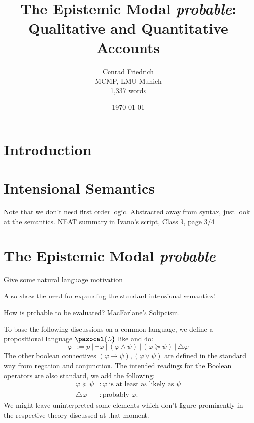 \documentclass{article}
\title{The Epistemic Modal \emph{probable}: Qualitative and Quantitative Accounts}
\author{Conrad Friedrich \\ MCMP, LMU Munich \\ 1,337 words}
\date{\today}
\theoremstyle{definition}
\renewcommand{\L}{\pazocal{L}}
\begin{document}
\onehalfspacing

\maketitle

\tableofcontents
\section{Introduction}



\section{Intensional Semantics}
Note that we don't need first order logic. 
Abstracted away from syntax, just look at the semantics.
NEAT summary in Ivano's script, Class 9, page 3/4
\section{The Epistemic Modal \emph{probable}}
Give some natural language motivation

Also show the need for expanding the standard intensional semantics!

How is probable to be evaluated? MacFarlane's Solipcism. 

To base the following discussions on a common language, we define a
propositional language $\L$ like \textcite{harrison-trainor17_prefer} and
\textcite{holliday13_measur} do:
\[
\varphi ::= p ~|~ \neg \varphi ~|~ (\varphi \land \psi) ~|~  (\varphi \succeq \psi) ~|~ \triangle\varphi 
\]
The other boolean connectives $(\varphi \rightarrow \psi), (\varphi \vee
\psi)$ are defined in the standard way from negation and conjunction. The
intended readings for the Boolean operators are also standard, we add the following:
\begin{align*}
  \varphi \succeq \psi &: \varphi \text{ is at least as likely as } \psi \\
  \triangle \varphi &:\text{probably } \varphi.
\end{align*}
We might leave uninterpreted some elements which don't figure prominently in the respective theory discussed at that moment.
\end{document}
